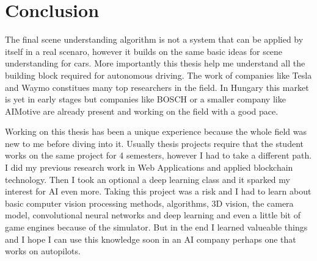\chapter{Conclusion}
\label{chap:conclusion}

The final scene understanding algorithm is not a system that can be applied by
itself in a real scenaro, however it builds on the same basic ideas for scene
understanding for cars. More importantly this thesis help me understand all the
building block required for autonomous driving. The work of companies like Tesla
and Waymo constitues many top researchers in the field. In Hungary this market
is yet in early stages but companies like BOSCH or a smaller company like
AIMotive are already present and working on the field with a good pace.

Working on this thesis has been a unique experience because the whole field was
new to me before diving into it. Usually thesis projects require that the
student works on the same project for 4 semesters, however I had to take a
different path. I did my previous research work in Web Applications and applied
blockchain technology. Then I took an optional a deep learning class and it
sparked my interest for AI even more. Taking this project was a risk and I had
to learn about basic computer vision processing methods, algorithms, 3D vision,
the camera model, convolutional neural networks and deep learning and even a
little bit of game engines because of the simulator. But in the end I learned
valueable things and I hope I can use this knowledge soon in an AI company
perhaps one that works on autopilots.

